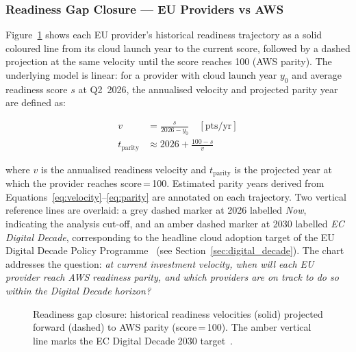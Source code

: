 \subsubsection{Readiness Gap Closure — EU Providers vs AWS}
\label{subsubsec:chart_gap_closure}

Figure~\ref{fig:financial_row1_left} shows each EU provider's historical readiness trajectory as a solid coloured line from its cloud launch year to the current score, followed by a dashed projection at the same velocity until the score reaches 100 (AWS parity). The underlying model is linear: for a provider with cloud launch year $y_0$ and average readiness score $s$ at Q2~2026, the annualised velocity and projected parity year are defined as:

\begin{align}
  v &= \frac{s}{2026 - y_0} \quad [\text{pts/yr}] \label{eq:velocity} \\[4pt]
  t_{\text{parity}} &\approx 2026 + \frac{100 - s}{v} \label{eq:parity}
\end{align}

\noindent where $v$ is the annualised readiness velocity and $t_{\text{parity}}$ is the projected year at which the provider reaches score\,=\,100. Estimated parity years derived from Equations~\ref{eq:velocity}--\ref{eq:parity} are annotated on each trajectory. Two vertical reference lines are overlaid: a grey dashed marker at 2026 labelled \emph{Now}, indicating the analysis cut-off, and an amber dashed marker at 2030 labelled \emph{EC Digital Decade}, corresponding to the headline cloud adoption target of the EU Digital Decade Policy Programme~\cite{EC_DigitalDecade_2022} (see Section~\ref{sec:digital_decade}). The chart addresses the question: \emph{at current investment velocity, when will each EU provider reach AWS readiness parity, and which providers are on track to do so within the Digital Decade horizon?}

\begin{figure}[htbp]
  \centering
  \caption{Readiness gap closure: historical readiness velocities (solid) projected forward (dashed) to AWS parity (score\,=\,100). The amber vertical line marks the EC Digital Decade 2030 target~\cite{EC_DigitalDecade_2022}.}
  \label{fig:financial_row1_left}
\end{figure}

